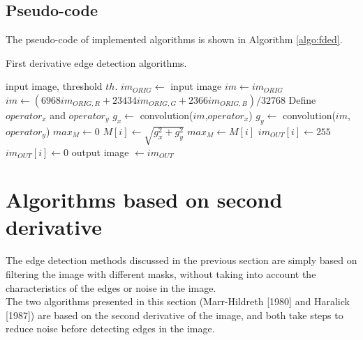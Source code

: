 \documentclass{ipol}
\numberwithin{equation}{section}
\numberwithin{table}{section}
\numberwithin{figure}{section}
\begin{document}

\subsection{Pseudo-code}

The pseudo-code of implemented algorithms is shown in Algorithm \ref{algo:fded}.
\clearpage

\begin{algorithm}[t]
\caption{First derivative edge detection algorithms.}
\label{algo:fded}
\begin{algorithmic}[1]
\REQUIRE input image, threshold $th$.
\STATE $im_{ORIG} \leftarrow$ input image
	\STATE $im \leftarrow im_{ORIG}$
\ELSE 
	\STATE $im \leftarrow (6968im_{ORIG,R}+23434im_{ORIG,G}+2366im_{ORIG,B})/32768$ 
\ENDIF
\STATE Define $operator_x$ and $operator_y$ 
\STATE $g_x \leftarrow$ convolution($im$,$operator_x$)
\STATE $g_y \leftarrow$ convolution($im$,$operator_y$)
\STATE $max_M \leftarrow 0$
	\STATE $M[i] \leftarrow \sqrt{g_x^2+g_y^2}$ 
		\STATE $max_M \leftarrow M[i]$
	\ENDIF
\ENDFOR
{}
		\STATE $im_{OUT}[i] \leftarrow 255$
	\ELSE
		\STATE $im_{OUT}[i] \leftarrow 0$
	\ENDIF
\ENDFOR
\RETURN output image $\leftarrow im_{OUT}$
\end{algorithmic}
\end{algorithm}


\section{Algorithms based on second derivative}
\label{sec:second}

The edge detection methods discussed in the previous section are simply based on filtering the 
image with different masks, without taking into account the characteristics of the edges or 
noise in the image. \\

The two algorithms presented in this section (Marr-Hildreth \cite{AIM-518} [1980] and Haralick \cite{bb20239} [1987]) 
are based on the second derivative of the image, and both take steps to reduce noise before 
detecting edges in the image.
\end{document}
